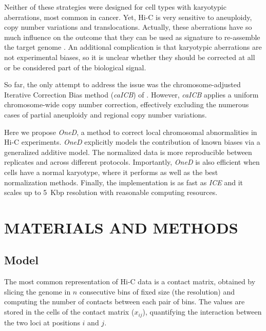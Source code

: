 \documentclass[a4,center,fleqn]{NAR}
\begin{document}
Neither of these strategies were designed for cell types with karyotypic
aberrations, most common in cancer. Yet, Hi-C is very sensitive to
aneuploidy, copy number variations and translocations.  Actually, these
aberrations have so much influence on the outcome that they can be used as
signature to re-assemble the target genome \citep{korbel2013genome}. An
additional complication is that karyotypic aberrations are not
experimental biases, so it is unclear whether they should be corrected at
all or be considered part of the biological signal.

\enlargethispage{-65.1pt}

So far, the only attempt to address the issue was the chromosome-adjusted
Iterative Correction Bias method (\textit{caICB}) of
\cite{wu2016computational}. However, \textit{caICB} applies a uniform
chromosome-wide copy number correction, effectively excluding the numerous
cases of partial aneuploidy and regional copy number variations.

Here we propose \textit{OneD}, a method to correct local chromosomal
abnormalities in Hi-C experiments. \textit{OneD} explicitly models the
contribution of known biases via a generalized additive model. The
normalized data is more reproducible between replicates and across
different protocols. Importantly, \textit{OneD} is also efficient when
cells have a normal karyotype, where it performs as well as the best
normalization methods. Finally, the implementation is as fast as
\textit{ICE} and it scales up to 5~Kbp resolution with reasonable
computing resources.


\section{MATERIALS AND METHODS}

\subsection{Model}

The most common representation of Hi-C data is a contact matrix, obtained
by slicing the genome in $n$ consecutive bins of fixed size (the
resolution) and computing the number of contacts between each pair of
bins. The values are stored in the cells of the contact matrix ($x_{ij}$),
quantifying the interaction between the two loci at positions $i$ and
$j$.
\end{document}
